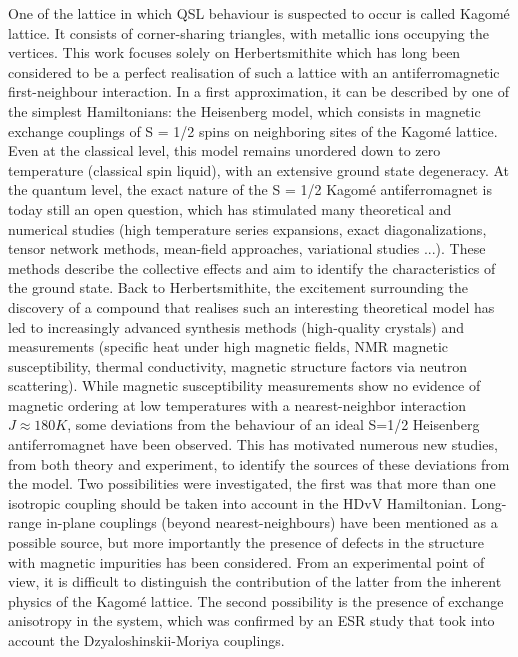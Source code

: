 \documentclass[12pt,a4paper]{report}
\numberwithin{equation}{section}
\begin{document}
One of the lattice in which QSL behaviour is suspected to occur is called Kagomé lattice. 
It consists of corner-sharing triangles, with metallic ions occupying the vertices.
This work focuses solely on Herbertsmithite which has long been considered to be a perfect realisation of such a lattice with an antiferromagnetic first-neighbour interaction.
In a first approximation, it can be described by one of the simplest Hamiltonians: the Heisenberg model, which consists in magnetic exchange couplings of S = 1/2 spins on neighboring sites of the Kagomé lattice.
Even at the classical level, this model remains unordered down to zero temperature (classical spin liquid), with an extensive ground state degeneracy.
At the quantum level, the exact nature of the S = 1/2 Kagomé antiferromagnet is today still an open question, which has stimulated many theoretical and numerical studies (high
temperature series expansions, exact diagonalizations\cite{lauchli_sfrac12_2019}, tensor network methods\cite{he_signatures_2017,liao_gapless_2017}, mean-field approaches, variational studies \cite{iqbal_gapless_2013}...).
These methods describe the collective effects and aim to identify the characteristics of the ground state.
Back to Herbertsmithite, the excitement surrounding the discovery of a compound that realises such an interesting theoretical model has led to increasingly advanced synthesis methods (high-quality crystals) and measurements (specific heat under high magnetic fields, NMR magnetic susceptibility, thermal conductivity, magnetic structure factors via neutron scattering).
While magnetic susceptibility measurements show no evidence of magnetic ordering at low temperatures with a nearest-neighbor interaction $J\approx180K$\cite{helton_spin_2007}, some deviations from the behaviour of an ideal S=1/2 Heisenberg antiferromagnet have been observed.
This has motivated numerous new studies, from both theory and experiment, to identify the sources of these deviations from the model.
Two possibilities were investigated, the first was that more than one isotropic coupling should be taken into account in the HDvV Hamiltonian.
Long-range in-plane couplings (beyond nearest-neighbours) have been mentioned as a possible source, but more importantly the presence of defects in the structure with magnetic impurities has been considered.
From an experimental point of view, it is difficult to distinguish the contribution of the latter from the inherent physics of the Kagomé lattice.
The second possibility is the presence of exchange anisotropy in the system, which was confirmed by an ESR study that took into account the Dzyaloshinskii-Moriya couplings.
\end{document}
